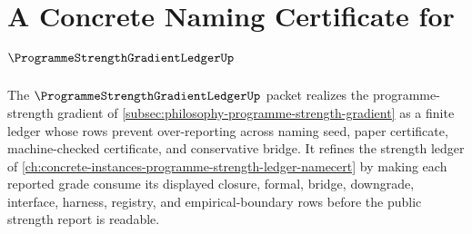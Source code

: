 \chapter{A Concrete Naming Certificate for $\ProgrammeStrengthGradientLedgerUp$}
\label{ch:concrete-instances-programme-strength-gradient-ledger-namecert}

The $\ProgrammeStrengthGradientLedgerUp$ packet realizes the programme-strength gradient of \autoref{subsec:philosophy-programme-strength-gradient} as a finite ledger whose rows prevent over-reporting across naming seed, paper certificate, machine-checked certificate, and conservative bridge. It refines the strength ledger of \autoref{ch:concrete-instances-programme-strength-ledger-namecert} by making each reported grade consume its displayed closure, formal, bridge, downgrade, interface, harness, registry, and empirical-boundary rows before the public strength report is readable.

